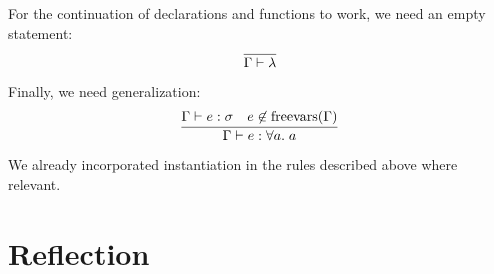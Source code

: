 For the continuation of declarations and functions to work, we need an empty statement:
\[
    \infer{\Gamma \vdash \lambda}{}
\]

Finally, we need generalization:
\[
    \infer{\Gamma \vdash e : \forall a.\; a}{
        \Gamma \vdash e : \sigma &
        e \not\in \operatorname{freevars}(\Gamma)
    }
\]

We already incorporated instantiation in the rules described above where relevant.

\section{Reflection}


